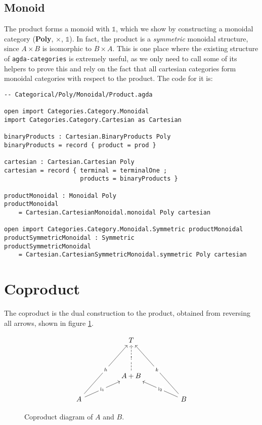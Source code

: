 \subsection{Monoid}

The product forms a monoid with $\mathbb{1}$, which we show by constructing a monoidal category (\textbf{Poly}, $\times$, $\mathbb{1}$). In fact, the product is a \textit{symmetric} monoidal structure, since $A \times B$ is isomorphic to $B \times A$. This is one place where the existing structure of \texttt{agda-categories} is extremely useful, as we only need to call some of its helpers to prove this and rely on the fact that all cartesian categories form monoidal categories with respect to the product. The code for it is:

\begin{verbatim}
-- Categorical/Poly/Monoidal/Product.agda

open import Categories.Category.Monoidal
import Categories.Category.Cartesian as Cartesian

binaryProducts : Cartesian.BinaryProducts Poly
binaryProducts = record { product = prod }

cartesian : Cartesian.Cartesian Poly
cartesian = record { terminal = terminalOne ; 
                     products = binaryProducts }

productMonoidal : Monoidal Poly
productMonoidal 
    = Cartesian.CartesianMonoidal.monoidal Poly cartesian

open import Categories.Category.Monoidal.Symmetric productMonoidal
productSymmetricMonoidal : Symmetric
productSymmetricMonoidal 
    = Cartesian.CartesianSymmetricMonoidal.symmetric Poly cartesian
\end{verbatim}

\newpage

\section{Coproduct}
The coproduct is the dual construction to the product, obtained from reversing all arrows, shown in figure \ref{fig:coproductDiagram}.

\begin{figure}[H]
  \[\begin{tikzcd}
    && T \\
    \\
    && {A + B} \\
    A &&&& B
    \arrow["{\text{i}_1}"{description}, from=4-1, to=3-3]
    \arrow["{\text{i}_2}"{description}, from=4-5, to=3-3]
    \arrow["{!}"{description}, dashed, from=3-3, to=1-3]
    \arrow["h"{description}, from=4-1, to=1-3]
    \arrow["k"{description}, from=4-5, to=1-3]
  \end{tikzcd}\]
  \caption{Coproduct diagram of $A$ and $B$.}
  \label{fig:coproductDiagram}
  \end{figure}

